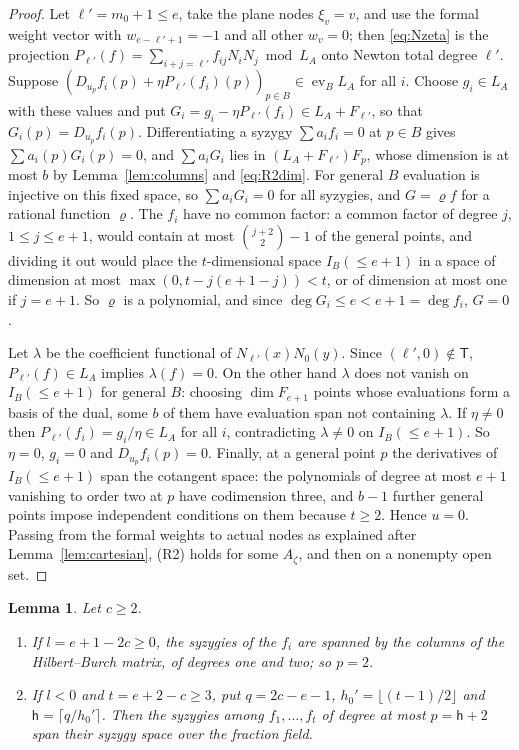 \documentclass{amsart}
\newtheorem{lemma}[theorem]{Lemma}
\theoremstyle{definition}
\theoremstyle{remark}
\numberwithin{equation}{section}
\DeclareMathOperator{\ev}{ev}
\begin{document}
\begin{proof}
Let $\ell'=m_0+1\le e$, take the plane nodes $\xi_v=v$, and use the formal weight vector
with $w_{e-\ell'+1}=-1$ and all other $w_v=0$; then \eqref{eq:Nzeta} is the projection
$P_{\ell'}(f)=\sum_{i+j=\ell'}f_{ij}N_iN_j\bmod L_A$ onto Newton total degree $\ell'$. Suppose
$(D_{u_p}f_i(p)+\eta P_{\ell'}(f_i)(p))_{p\in B}\in\ev_BL_A$ for all $i$. Choose
$g_i\in L_A$ with these values and put $G_i=g_i-\eta P_{\ell'}(f_i)\in L_A+F_{\ell'}$, so
that $G_i(p)=D_{u_p}f_i(p)$. Differentiating a syzygy $\sum a_if_i=0$ at $p\in B$ gives
$\sum a_i(p)G_i(p)=0$, and $\sum a_iG_i$ lies in $(L_A+F_{\ell'})F_p$, whose dimension is
at most $b$ by Lemma~\ref{lem:columns} and \eqref{eq:R2dim}. For general $B$ evaluation is
injective on this fixed space, so $\sum a_iG_i=0$ for all syzygies, and $G=\varrho f$ for a
rational function $\varrho$. The $f_i$ have no common factor: a common factor of degree
$j$, $1\le j\le e+1$, would contain at most $\binom{j+2}2-1$ of the general points, and
dividing it out would place the $t$-dimensional space $I_B(\le e+1)$ in a space of
dimension at most $\max(0,t-j(e+1-j))<t$, or of dimension at most one if $j=e+1$. So
$\varrho$ is a polynomial, and since $\deg G_i\le e<e+1=\deg f_i$, $G=0$.

Let $\lambda$ be the coefficient functional of $N_{\ell'}(x)N_0(y)$. Since
$(\ell',0)\notin\mathsf T$, $P_{\ell'}(f)\in L_A$ implies $\lambda(f)=0$. On the other
hand $\lambda$ does not vanish on $I_B(\le e+1)$ for general $B$: choosing
$\dim F_{e+1}$ points whose evaluations form a basis of the dual, some $b$ of them have
evaluation span not containing $\lambda$. If $\eta\ne0$ then $P_{\ell'}(f_i)=g_i/\eta\in L_A$
for all $i$, contradicting $\lambda\ne0$ on $I_B(\le e+1)$. So $\eta=0$, $g_i=0$ and
$D_{u_p}f_i(p)=0$. Finally, at a general point $p$ the derivatives of
$I_B(\le e+1)$ span the cotangent space: the polynomials of degree at most $e+1$
vanishing to order two at $p$ have codimension three, and $b-1$ further general points
impose independent conditions on them because $t\ge2$. Hence $u=0$. Passing from the
formal weights to actual nodes as explained after Lemma~\ref{lem:cartesian}, (R2) holds
for some $A_\zeta$, and then on a nonempty open set.
\end{proof}

\begin{lemma}\label{lem:syzdeg}
Let $c\ge2$.
\begin{enumerate}[label=\textup{(\alph*)}]
\item If $l=e+1-2c\ge0$, the syzygies of the $f_i$ are spanned by the columns of the
Hilbert--Burch matrix, of degrees one and two; so $p=2$.
\item If $l<0$ and $t=e+2-c\ge3$, put $q=2c-e-1$, $h_0'=\lfloor(t-1)/2\rfloor$ and
$\mathsf h=\lceil q/h_0'\rceil$. Then the syzygies among $f_1,\dots,f_t$ of degree at most
$p=\mathsf h+2$ span their syzygy space over the fraction field.
\end{enumerate}
\end{lemma}
\end{document}
